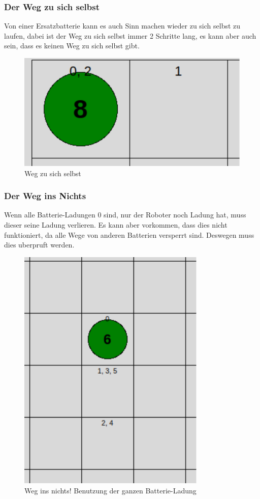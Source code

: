 \documentclass[a4paper,12pt,arial]{scrartcl}
\begin{document}
\subsubsection{Der Weg zu sich selbst}
Von einer Ersatzbatterie kann es auch Sinn machen wieder zu sich selbst zu laufen,
dabei ist der Weg zu sich selbst immer 2 Schritte lang, es kann aber auch sein, dass es keinen Weg zu sich selbst gibt.
\begin{figure}[h]
    \centering
    \includegraphics[width=\textwidth]{way_to_self.pdf}
    \caption{Weg zu sich selbst}
    \label{fig:way_to_self}
\end{figure}

\newpage
\subsubsection{Der Weg ins Nichts}
Wenn alle Batterie-Ladungen 0 sind, nur der Roboter noch Ladung hat, muss dieser seine Ladung verlieren. Es kann aber vorkommen, dass dies nicht funktioniert, da alle Wege von anderen Batterien versperrt sind. Deswegen muss dies uberpruft werden.
\begin{figure}[h]
    \centering
    \includegraphics[width=0.8\textwidth]{way_ins_nothing.pdf}
    \caption{Weg ins nichts! Benutzung der ganzen Batterie-Ladung}
    \label{fig:way_to_nothing}
\end{figure}
\end{document}
